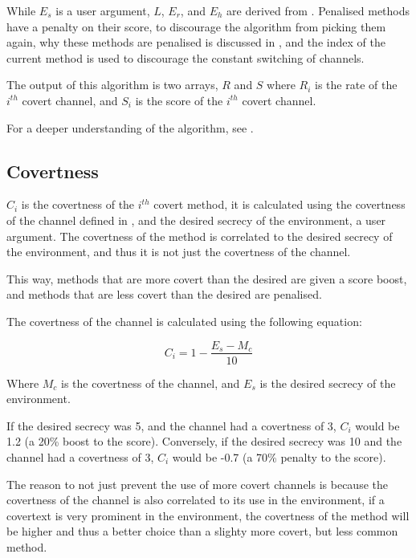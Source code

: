 While $E_s$ is a user argument, $L$, $E_r$, and $E_h$ are derived from . Penalised methods have a penalty on their score, to discourage the algorithm from picking them again, why these methods are penalised is discussed in , and the index of the current method is used to discourage the constant switching of channels.

The output of this algorithm is two arrays, $R$ and $S$ where $R_i$ is the rate of the $i^{th}$ covert channel, and $S_i$ is the score of the $i^{th}$ covert channel.

For a deeper understanding of the algorithm, see .

\subsection{Covertness}

$C_i$ is the covertness of the $i^{th}$ covert method, it is calculated using the covertness of the channel defined in , and the desired secrecy of the environment, a user argument. The covertness of the method is correlated to the desired secrecy of the environment, and thus it is not just the covertness of the channel.

This way, methods that are more covert than the desired are given a score boost, and methods that are less covert than the desired are penalised.

The covertness of the channel is calculated using the following equation:

\begin{equation}
    C_i = 1 - \frac{E_s - M_c}{10}
\end{equation}

Where $M_c$ is the covertness of the channel, and $E_s$ is the desired secrecy of the environment.

If the desired secrecy was 5, and the channel had a covertness of 3, $C_i$ would be 1.2 (a 20\% boost to the score). Conversely, if the desired secrecy was 10 and the channel had a covertness of 3, $C_i$ would be -0.7 (a 70\% penalty to the score).

The reason to not just prevent the use of more covert channels is because the covertness of the channel is also correlated to its use in the environment, if a covertext is very prominent in the environment, the covertness of the method will be higher and thus a better choice than a slighty more covert, but less common method.

